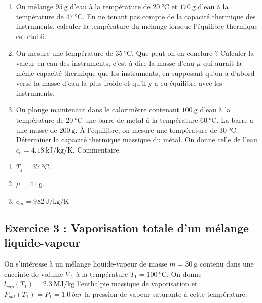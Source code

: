 \begin{enumerate}
	\item On mélange $\SI{95}{\gram}$ d'eau à la température de $\SI{20}{\degreeCelsius}$ et $\SI{170}{\gram}$ d'eau à la température de $\SI{47}{\degreeCelsius}$. En ne tenant pas compte de la capacité thermique des instruments, calculer la température du mélange lorsque l'équilibre thermique est établi.
	\item On mesure une température de $\SI{35}{\degreeCelsius}$. Que peut-on en conclure ? Calculer la valeur en eau des instruments, c'est-à-dire la masse d'eau $\mu$ qui aurait la même capacité thermique que les instruments, en supposant qu'on a d'abord versé la masse d'eau la plus froide et qu'il y a eu équilibre avec les instruments.
	\item On plonge maintenant dans le calorimètre contenant $\SI{100}{\gram}$ d'eau à la température de $\SI{20}{\degreeCelsius}$ une barre de métal à la température $\SI{60}{\degreeCelsius}$. La barre a une masse de $\SI{200}{\gram}$. À l'équilibre, on mesure une température de $\SI{30}{\degreeCelsius}$. Déterminer la capacité thermique massique du métal. On donne celle de l'eau $c_e = \SI{4.18}{\kilo\joule\per\kilogram\per\kelvin}$. Commentaire.
\end{enumerate}

\begin{enumerate}
	\item $T_f = \SI{37}{\degreeCelsius}$.
	\item $\mu = \SI{41}{\gram}$.
	\item $c_m = \SI{982}{\joule\per\kilogram\per\kelvin}$
\end{enumerate}

\subsection{Exercice 3 : Vaporisation totale d'un mélange liquide-vapeur}

On s'intéresse à un mélange liquide-vapeur de masse $m = \SI{30}{\gram}$ contenu dans une enceinte de volume $V_A$ à la température $T_1 = \SI{100}{\degreeCelsius}$. On donne $l_{vap}(T_1) = \SI{2.3}{\mega\joule\per\kilogram}$ l'enthalpie massique de vaporisation et $P_{sat}(T_1) = P_1 = \SI{1.0}{bar}$ la pression de vapeur saturante à cette température.

